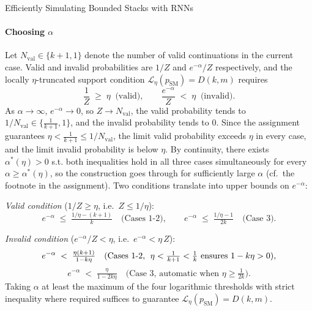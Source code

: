 \begin{question}{Efficiently Simulating Bounded Stacks with RNNs}
\begin{subquestion}
    \paragraph{Choosing $\alpha$} Let $N_{\text{val}} \in \{k+1, 1\}$ denote the number of valid continuations in the current case. 
    Valid and invalid probabilities are $1/Z$ and $e^{-\alpha}/Z$ respectively, and the locally $\eta$-truncated support condition $\mathcal{L}_{\eta}(p_{\text{SM}}) = D(k, m)$ requires
    \[
        \frac{1}{Z} \;\ge\; \eta \;\;\text{(valid)}, \qquad \frac{e^{-\alpha}}{Z} \;<\; \eta \;\;\text{(invalid)}.
    \]
    As $\alpha \to \infty$, $e^{-\alpha} \to 0$, so $Z \to N_{\text{val}}$, the valid probability tends to $1/N_{\text{val}} \in \{\tfrac{1}{k+1}, 1\}$, and the invalid probability tends to $0$. 
    Since the assignment guarantees $\eta < \tfrac{1}{k+1} \le 1/N_{\text{val}}$, the limit valid probability exceeds $\eta$ in every case, and the limit invalid probability is below $\eta$. 
    By continuity, there exists $\alpha^{*}(\eta) > 0$ s.t. both inequalities hold in all three cases simultaneously for every $\alpha \ge \alpha^{*}(\eta)$, so the construction goes through for sufficiently large $\alpha$ (cf.\ the footnote in the assignment).
    Two conditions translate into upper bounds on $e^{-\alpha}$:

    \emph{Valid condition} ($1/Z \ge \eta$, i.e.\ $Z \le 1/\eta$):
    \[
        e^{-\alpha} \;\le\; \tfrac{1/\eta - (k+1)}{k} \quad \text{(Cases 1-2)},
        \qquad
        e^{-\alpha} \;\le\; \tfrac{1/\eta - 1}{2k} \quad \text{(Case 3)}.
    \]

    \emph{Invalid condition} ($e^{-\alpha}/Z < \eta$, i.e.\ $e^{-\alpha} < \eta\, Z$):
    \[
        e^{-\alpha} \;<\; \tfrac{\eta(k+1)}{1 - k\eta} \quad \text{(Cases 1-2, \;$\eta < \tfrac{1}{k+1} < \tfrac{1}{k}$ ensures $1 - k\eta > 0$)},
    \]
    \[
        e^{-\alpha} \;<\; \tfrac{\eta}{1 - 2k\eta} \quad \text{(Case 3, automatic when $\eta \ge \tfrac{1}{2k}$)}.
    \]
    Taking $\alpha$ at least the maximum of the four logarithmic thresholds with strict inequality where required suffices to guarantee $\mathcal{L}_{\eta}(p_{\text{SM}}) = D(k, m)$.
\end{subquestion}


\end{question}
